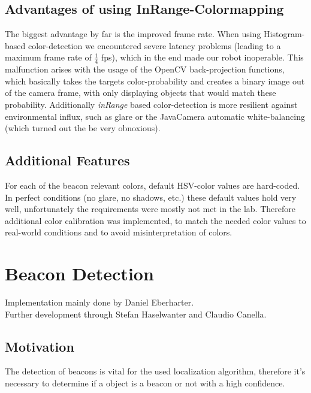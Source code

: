 \documentclass[703031]{iisreport}
\begin{document}
\subsection{Advantages of using InRange-Colormapping}
The biggest advantage by far is the improved frame rate. When using Histogram-based color-detection we encountered severe latency problems (leading to a maximum frame rate of $\frac{1}{4}$ fps), which in the end made our robot inoperable. This malfunction arises with the usage of the OpenCV back-projection functions, which basically takes the targets color-probability and creates a binary image out of the camera frame, with only displaying objects that would match these probability.
Additionally \emph{inRange} based color-detection is more resilient against environmental influx, such as glare or the JavaCamera automatic white-balancing (which turned out the be very obnoxious).

\subsection{Additional Features}
For each of the beacon relevant colors, default HSV-color values are hard-coded. In perfect conditions (no glare, no shadows, etc.) these default values hold very well, unfortunately the requirements were mostly not met in the lab. Therefore additional color calibration was implemented, to match the needed color values to real-world conditions and to avoid misinterpretation of colors.

\section{Beacon Detection}
Implementation mainly done by Daniel Eberharter. \\
Further development through Stefan Haselwanter and Claudio Canella.
\subsection{Motivation}
The detection of beacons is vital for the used localization algorithm, therefore it's necessary to determine if a object is a beacon or not with a high confidence. 
\end{document}
